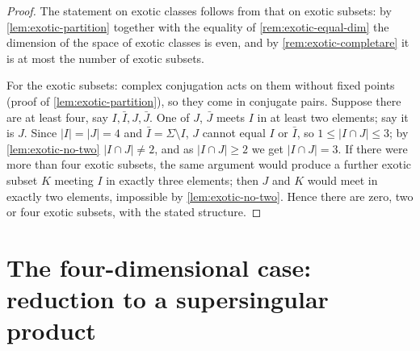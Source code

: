 \begin{proof}
  The statement on exotic classes follows from that on exotic subsets: by
  \cref{lem:exotic-partition} together with the equality of
  \cref{rem:exotic-equal-dim} the dimension of the space of exotic classes is
  even, and by \cref{rem:exotic-completare} it is at most the number of exotic
  subsets.

  For the exotic subsets: complex conjugation acts on them without fixed points
  (proof of \cref{lem:exotic-partition}), so they come in conjugate pairs.
  Suppose there are at least four, say \(I, \bar I, J, \bar J\). One of \(J\),
  \(\bar J\) meets \(I\) in at least two elements; say it is \(J\). Since
  \(|I| = |J| = 4\) and \(\bar I = \Sigma \setminus I\), \(J\) cannot equal \(I\)
  or \(\bar I\), so \(1 \le |I \cap J| \le 3\); by \cref{lem:exotic-no-two}
  \(|I \cap J| \neq 2\), and as \(|I \cap J| \ge 2\) we get \(|I \cap J| = 3\).
  If there were more than four exotic subsets, the same argument would produce a
  further exotic subset \(K\) meeting \(I\) in exactly three elements; then
  \(J\) and \(K\) would meet in exactly two elements, impossible by
  \cref{lem:exotic-no-two}. Hence there are zero, two or four exotic subsets,
  with the stated structure.
\end{proof}

\section*{The four-dimensional case: reduction to a supersingular product}

